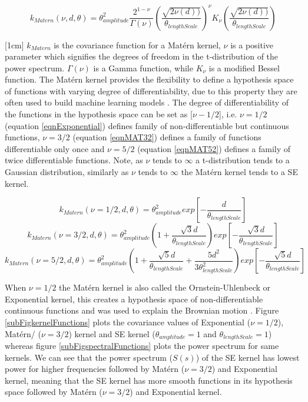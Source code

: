 \begin{equation}
k_{Matern}(\nu, d, \theta) = \theta_{amplitude}^2\frac{2^{1- \nu }}{\Gamma (\nu)}\left ( \frac{\sqrt{2\nu(d))}}{\theta_{lengthScale}} \right )^{\nu}K_{\nu}\left ( \frac{\sqrt{2\nu(d))}}{\theta_{lengthScale}} \right)
\end{equation}

[1cm]
$k_{Matern}$ is the covariance function for a Mat\'ern kernel, $\nu$ is a positive parameter which signifies the degrees of freedom in the t-distribution of the power spectrum. $\Gamma (\nu)$ is a Gamma function, while $K_{\nu}$ is a modified Bessel function. The Mat\'ern kernel provides the flexibility to define a hypothesis space of functions with varying degree of differentiability, due to this property they are often used to build machine learning models \cite{minasny2005matern, cornford2002modelling}. The degree of differentiability of the functions in the hypothesis space can be set as [$\nu-1/2$], i.e.  $\nu = 1/2$ (equation \ref{eqnExponential}) defines family of non-differentiable but continuous functions, $\nu = 3/2$ (equation \ref{eqnMAT32}) defines a family of functions differentiable only once and $\nu = 5/2$ (equation \ref{eqnMAT52}) defines a family of twice differentiable functions. Note, as $\nu$ tends to $\infty$ a t-distribution tends to a Gaussian distribution, similarly as $\nu$ tends to $\infty$ the Mat\'ern kernel tends to a SE kernel. 

\begin{equation}\label{eqnExponential}
k_{Matern}(\nu = 1/2, d, \theta) = \theta_{amplitude}^2exp[-\frac{d}{\theta_{lengthScale}}]
\end{equation}
\begin{equation}\label{eqnMAT32}
k_{Matern}(\nu = 3/2, d, \theta) = \theta_{amplitude}^2 (1 + \frac{\sqrt{3}d}{\theta_{lengthScale}}) exp[-\frac{\sqrt{3}d}{\theta_{lengthScale}}]
\end{equation}
\begin{equation}\label{eqnMAT52}
k_{Matern}(\nu = 5/2, d, \theta) = \theta_{amplitude}^2(1 + \frac{\sqrt{5}d}{\theta_{lengthScale}} + \frac{5d^2}{3\theta_{lengthScale}^2})
exp[-\frac{\sqrt{5}d}{\theta_{lengthScale}}]
\end{equation}

When $\nu = 1/2$ the Mat\'ern kernel is also called the Ornstein-Uhlenbeck or Exponential kernel, this creates a hypothesis space of non-differentiable continuous functions and was used to explain the Brownian motion \cite{uhlenbeck1930theory}. Figure \ref{subFigkernelFunctions} plots the covariance values of Exponential ($\nu=1/2$), Mat\'ern/ ($\nu=3/2$) kernel and SE kernel ($\theta_{amplitude} = 1$ and $\theta_{lengthScale} = 1$) whereas figure \ref{subFigspectralFunctions} plots the power spectrum for same kernels. We can see that the power spectrum ($S(s)$) of the SE kernel has lowest power for higher frequencies followed by Mat\'ern ($\nu=3/2$) and Exponential kernel, meaning that the SE kernel has more smooth functions in its hypothesis space followed by Mat\'ern ($\nu=3/2$) and Exponential kernel. 

